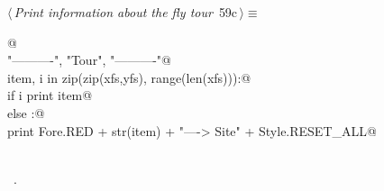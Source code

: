 \documentclass[11.5pt]{report}
\begin{document}
\vspace{-0.8cm} \newchunk
\begin{flushleft} \small\label{scrap88}\raggedright\small
{} $\langle\,${\itshape Print information about the fly tour}\nobreak\ {\footnotesize {59c}}$\,\rangle\equiv$
\vspace{-1ex}
\begin{list}{}{} \item
\mbox{}\verb@   @\\
\mbox{}\verb@print "\n----------", "\nFly Tour", "\n----------"@\\
\mbox{}\verb@for item, i in zip(zip(xfs,yfs), range(len(xfs))):@\\
\mbox{}\verb@   if i%2 == 0:@\\
\mbox{}\verb@       print item@\\
\mbox{}\verb@   else :@\\
\mbox{}\verb@       print Fore.RED + str(item) + "----> Site" +  Style.RESET_ALL@\\
\mbox{}\verb@@\\
\mbox{}\verb@@{\NWsep}
\end{list}
\vspace{-1.5ex}
\footnotesize
\begin{list}{}{\setlength{\itemsep}{-\parsep}\setlength{\itemindent}{-\leftmargin}}
\item \NWtxtMacroRefIn\ .

\item{}
\end{list}
\vspace{4ex}
\end{flushleft}
\end{document}
